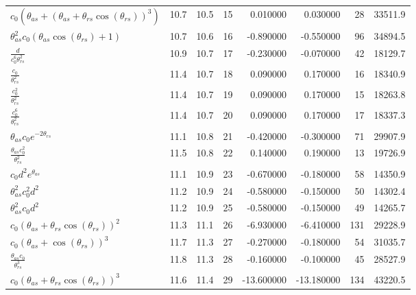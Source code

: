 \begin{tabularx}{\textwidth}{lllrrrrl}
$ c_{0} \left(\theta_{as} + \left(\theta_{as} + \theta_{rs} \cos{\left(\theta_{rs} \right)}\right)^{3}\right) $  &  10.7  &  10.5  &  15  &  0.010000  &  0.030000  &  28  &  33511.9  \\ 
$ \theta_{as}^{2} c_{0} \left(\theta_{as} \cos{\left(\theta_{rs} \right)} + 1\right) $  &  10.7  &  10.6  &  16  &  -0.890000  &  -0.550000  &  96  &  34894.5  \\ 
$ \displaystyle\frac{d}{c_{0}^{6} \theta_{rs}^{2}} $  &  10.9  &  10.7  &  17  &  -0.230000  &  -0.070000  &  42  &  18129.7  \\ 
$ \displaystyle\frac{c_{0}}{\theta_{rs}^{2}} $  &  11.4  &  10.7  &  18  &  0.090000  &  0.170000  &  16  &  18340.9  \\ 
$ \displaystyle\frac{c_{0}^{2}}{\theta_{rs}^{2}} $  &  11.4  &  10.7  &  19  &  0.090000  &  0.170000  &  15  &  18263.8  \\ 
$ \displaystyle\frac{c_{0}^{6}}{\theta_{rs}^{2}} $  &  11.4  &  10.7  &  20  &  0.090000  &  0.170000  &  17  &  18337.3  \\ 
$ \theta_{as} c_{0} e^{- 2 \theta_{rs}} $  &  11.1  &  10.8  &  21  &  -0.420000  &  -0.300000  &  71  &  29907.9  \\ 
$ \displaystyle\frac{\theta_{as} c_{0}^{2}}{\theta_{rs}^{2}} $  &  11.5  &  10.8  &  22  &  0.140000  &  0.190000  &  13  &  19726.9  \\ 
$ c_{0} d^{2} e^{\theta_{as}} $  &  11.1  &  10.9  &  23  &  -0.670000  &  -0.180000  &  58  &  14350.9  \\ 
$ \theta_{as}^{2} c_{0}^{2} d^{2} $  &  11.2  &  10.9  &  24  &  -0.580000  &  -0.150000  &  50  &  14302.4  \\ 
$ \theta_{as}^{2} c_{0} d^{2} $  &  11.2  &  10.9  &  25  &  -0.580000  &  -0.150000  &  49  &  14265.7  \\ 
$ c_{0} \left(\theta_{as} + \theta_{rs} \cos{\left(\theta_{rs} \right)}\right)^{2} $  &  11.3  &  11.1  &  26  &  -6.930000  &  -6.410000  &  131  &  29228.9  \\ 
$ c_{0} \left(\theta_{as} + \cos{\left(\theta_{rs} \right)}\right)^{3} $  &  11.7  &  11.3  &  27  &  -0.270000  &  -0.180000  &  54  &  31035.7  \\ 
$ \displaystyle\frac{\theta_{as} c_{0}}{\theta_{rs}^{3}} $  &  11.8  &  11.3  &  28  &  -0.160000  &  -0.100000  &  45  &  28527.9  \\ 
$ c_{0} \left(\theta_{as} + \theta_{rs} \cos{\left(\theta_{rs} \right)}\right)^{3} $  &  11.6  &  11.4  &  29  &  -13.600000  &  -13.180000  &  134  &  43220.5  \\ 

\end{tabularx}
